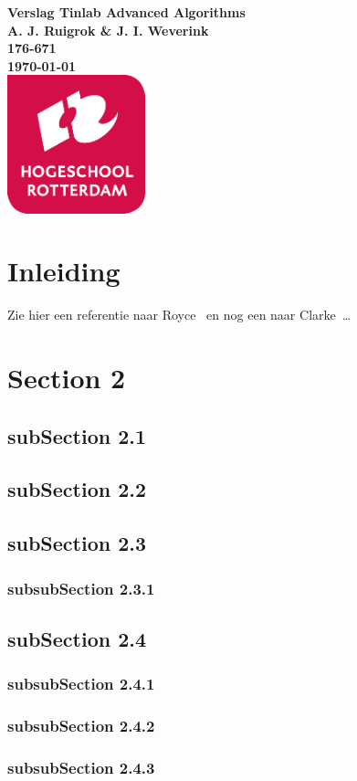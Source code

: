 \documentclass{article}
\begin{document}
\sffamily
\begin{titlepage}
  \centering
    \vfill
    {\bfseries\Huge
      Verslag Tinlab Advanced Algorithms \\
        \vskip2cm
      }
      {\bfseries\Large
        A. J. Ruigrok \& J. I. Weverink\\
      }
      {
        \bfseries\normalsize
        176-671\\
        \vskip1cm
        \today\\
    }
    \vfill
    \includegraphics[width=4cm]{logohr.png} %
    \vfill
    \vfill
\end{titlepage}
\newpage
\tableofcontents

\newpage
\section{Inleiding}
Zie hier een referentie naar Royce~\cite{royce1987managing} en nog een naar Clarke~\cite{modelchecking}\ldots 

\section{Section 2}
\subsection{subSection 2.1}
\subsection{subSection 2.2}
\subsection{subSection 2.3}
\subsubsection{subsubSection 2.3.1}
\subsection{subSection 2.4}
\subsubsection{subsubSection 2.4.1}
\subsubsection{subsubSection 2.4.2}
\subsubsection{subsubSection 2.4.3}



\newpage

\newpage


\end{document}
